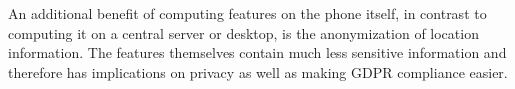 An additional benefit of computing features on the phone itself, in contrast to computing it on a central server or desktop, is the anonymization of location information. The features themselves contain much less sensitive information and therefore has implications on privacy as well as making GDPR compliance easier.



